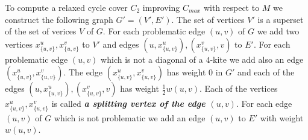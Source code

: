 \documentclass[a4, 11pt]{article}
\newcommand{\<}{\langle}
\renewcommand{\>}{\rangle}
\begin{document}
To compute a relaxed cycle cover  $C_2$  improving $C_{max}$  with respect to $M$  we construct the following  graph $G'=(V',E')$.
The set of vertices $V'$  is a superset of the set of verices $V$ of $G$.
For each problematic edge $(u,v)$  of $G$ we add two vertices $x_{\{u,v\}}^u, x_{\{u,v\}}^v$ to $V'$ and edges $(u, x_{\{u,v\}}^u), (x_{\{u,v\}}^v,v)$ to $E'$. For each problematic edge $(u,v)$ which is not a diagonal of a $4$-kite we add also an edge $(x_{\{u,v\}}^u, x_{\{u,v\}}^v)$. The edge $ (x_{\{u,v\}}^u, x_{\{u,v\}}^v)$ has weight $0$ in $G'$
and each of  the edges   $(u, x_{\{u,v\}}^u),  (x_{\{u,v\}}^v,v)$  has weight  $\frac{1}{2}w(u,v)$.
Each of the vertices  $x_{\{u,v\}}^u, x_{\{u,v\}}^v$  is called {\bf \em a splitting vertex of the edge $(u,v)$}.
For each edge $(u,v)$ of $G$ which is not problematic we add an edge $(u,v)$ to $E'$ with weight $w(u,v)$. 
\end{document}
